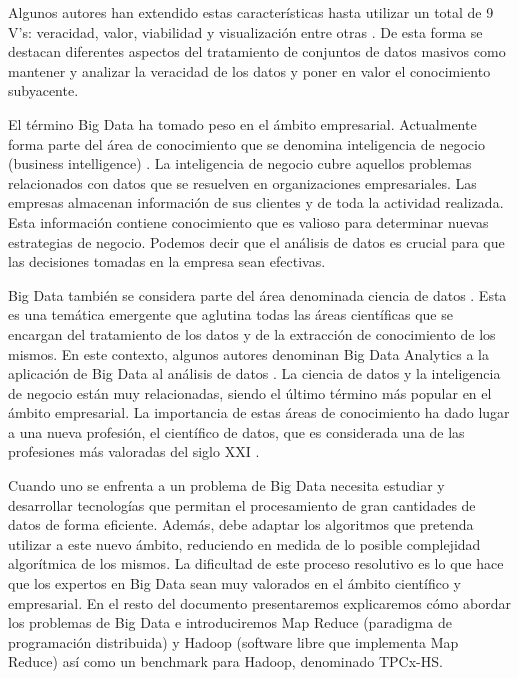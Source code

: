 \documentclass[10pt]{article}
\begin{document}
		Algunos autores han extendido estas características hasta utilizar un total de 9 V's: veracidad, valor, viabilidad y visualización entre otras \cite{understanding-big-data}. De esta forma se destacan diferentes aspectos del tratamiento de conjuntos de datos masivos como mantener y analizar la veracidad de los datos y poner en valor el conocimiento subyacente.
	
		El término Big Data ha tomado peso en el ámbito empresarial. Actualmente forma parte del área de conocimiento que se denomina inteligencia de negocio (business intelligence) \cite{business-intelligence}. La inteligencia de negocio cubre aquellos problemas relacionados con datos que se resuelven en organizaciones empresariales. Las empresas almacenan información de sus clientes y de toda la actividad realizada. Esta información contiene conocimiento que es valioso para determinar nuevas estrategias de negocio. Podemos decir que el análisis de datos es crucial para que las decisiones tomadas en la empresa sean efectivas. 
	
		Big Data también se considera parte del área denominada ciencia de datos \cite{data-science}. Esta es una temática emergente que aglutina todas las áreas científicas que se encargan del tratamiento de los datos y de la extracción de conocimiento de los mismos. En este contexto, algunos autores denominan Big Data Analytics a la aplicación de Big Data al análisis de datos \cite{big-data-trends}. La ciencia de datos y la inteligencia de negocio están muy relacionadas, siendo el último término más popular en el ámbito empresarial. La importancia de estas áreas de conocimiento ha dado lugar a una nueva profesión, el científico de datos, que es considerada una de las profesiones más valoradas del siglo XXI \cite{data-scientist}.
		
		Cuando uno se enfrenta a un problema de Big Data necesita estudiar y desarrollar tecnologías que permitan el procesamiento de gran cantidades de datos de forma eficiente. Además, debe adaptar los algoritmos que pretenda utilizar a este nuevo ámbito, reduciendo en medida de lo posible complejidad algorítmica de los mismos. La dificultad de este proceso resolutivo es lo que hace que los expertos en Big Data sean muy valorados en el ámbito científico y empresarial. En el resto del documento presentaremos explicaremos cómo abordar los problemas de Big Data e introduciremos Map Reduce (paradigma de programación distribuida) y Hadoop (software libre que implementa Map Reduce) así como un benchmark para Hadoop, denominado TPCx-HS.
		
\end{document}
